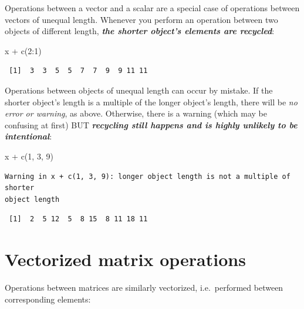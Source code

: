 \documentclass[
]{book}
\newenvironment{Shaded}{\begin{snugshade}}{\end{snugshade}}
\newcommand{\DecValTok}[1]{\textcolor[rgb]{0.00,0.00,0.81}{#1}}
\newcommand{\FunctionTok}[1]{\textcolor[rgb]{0.00,0.00,0.00}{#1}}
\newcommand{\NormalTok}[1]{#1}
\newcommand{\SpecialCharTok}[1]{\textcolor[rgb]{0.00,0.00,0.00}{#1}}
\begin{document}
Operations between a vector and a scalar are a special case of operations between vectors of unequal length. Whenever you perform an operation between two objects of different length, \textbf{\emph{the shorter object's elements are recycled}}:

\begin{Shaded}
\begin{Highlighting}[]
\NormalTok{x }\SpecialCharTok{+} \FunctionTok{c}\NormalTok{(}\DecValTok{2}\SpecialCharTok{:}\DecValTok{1}\NormalTok{)}
\end{Highlighting}
\end{Shaded}

\begin{verbatim}
 [1]  3  3  5  5  7  7  9  9 11 11
\end{verbatim}

\begin{rmdcaution}
Operations between objects of unequal length can occur by mistake. If
the shorter object's length is a multiple of the longer object's length,
there will be \emph{no error or warning}, as above. Otherwise, there is
a warning (which may be confusing at first) BUT \textbf{\emph{recycling
still happens and is highly unlikely to be intentional}}:
\end{rmdcaution}

\begin{Shaded}
\begin{Highlighting}[]
\NormalTok{x }\SpecialCharTok{+} \FunctionTok{c}\NormalTok{(}\DecValTok{1}\NormalTok{, }\DecValTok{3}\NormalTok{, }\DecValTok{9}\NormalTok{)}
\end{Highlighting}
\end{Shaded}

\begin{verbatim}
Warning in x + c(1, 3, 9): longer object length is not a multiple of shorter
object length
\end{verbatim}

\begin{verbatim}
 [1]  2  5 12  5  8 15  8 11 18 11
\end{verbatim}

\hypertarget{vectorized-matrix-operations}{%
\section{Vectorized matrix operations}\label{vectorized-matrix-operations}}

Operations between matrices are similarly vectorized, i.e.~performed between corresponding elements:
\end{document}

